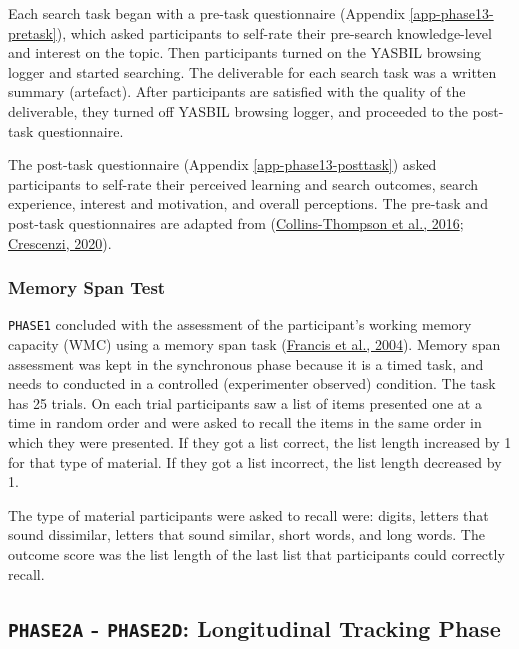 \documentclass[letterpaper, nobind]{templates/ociamthesis}
\begin{document}
Each search task began with a pre-task questionnaire (Appendix \ref{app-phase13-pretask}), which asked participants to self-rate their pre-search knowledge-level and interest on the topic.
Then participants turned on the YASBIL browsing logger and started searching.
The deliverable for each search task was a written summary (artefact).
After participants are satisfied with the quality of the deliverable, they turned off YASBIL browsing logger, and proceeded to the post-task questionnaire.

The post-task questionnaire (Appendix \ref{app-phase13-posttask}) asked participants to self-rate their perceived learning and search outcomes, search experience, interest and motivation, and overall perceptions.
The pre-task and post-task questionnaires are adapted from (\protect\hyperlink{ref-collins2016assessing}{Collins-Thompson et al., 2016}; \protect\hyperlink{ref-crescenzi2020adaptation}{Crescenzi, 2020}).

\hypertarget{memory-span-test}{%
\subsubsection{Memory Span Test}\label{memory-span-test}}

\texttt{PHASE1} concluded with the assessment of the participant's working memory capacity (WMC) using a memory span task (\protect\hyperlink{ref-francis2004coglab}{Francis et al., 2004}).
Memory span assessment was kept in the synchronous phase because it is a timed task, and needs to conducted in a controlled (experimenter observed) condition.
The task has 25 trials. On each trial participants saw a list of items presented one at a time in random order and were asked to recall the items in the same order in which they were presented. If they got a list correct, the list length increased by 1 for that type of material. If they got a list incorrect, the list length decreased by 1.

The type of material participants were asked to recall were: digits, letters that sound dissimilar, letters that sound similar, short words, and long words. The outcome score was the list length of the last list that participants could correctly recall.

\hypertarget{sec-method-phase2}{%
\subsection{\texorpdfstring{\texttt{PHASE2A} - \texttt{PHASE2D}: Longitudinal Tracking Phase}{PHASE2A - PHASE2D: Longitudinal Tracking Phase}}\label{sec-method-phase2}}
\end{document}

